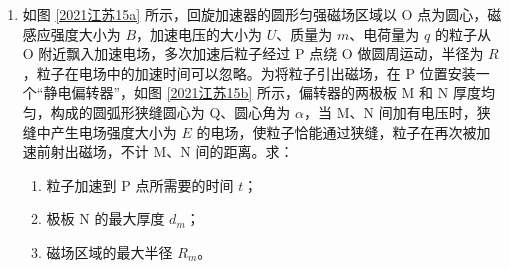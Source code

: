 \documentclass[\gkver]{gaokaozhenti}
\begin{document}
\begin{enumerate}
{B 受力平衡 $F_{1}\cos37^{\circ}+F_{2}\cos37^{\circ}=mg$，$F_{1}\sin37^{\circ}=F_{2}\sin37^{\circ}$。

解得 $F=\frac{3mg}{8}$。

（2）设装置转动的角速度为 $\omega$，对 A 有 $F=M\omega^{2}\cdot\frac{8}{5}L$。

对 B 有 $mg\tan53^{\circ} = m\omega^{2}\cdot\frac{4}{5}L$。

解得 $M = \frac{9}{64}m$。

（3）B 上升的高度 $h = \frac{1}{5}L$，A、B 的动能分别为

$E_{\mathrm{kA}} = \frac{1}{2}M\left(\omega\frac{8}{5}L\right)^{2}$，$E_{\mathrm{kB}} = \frac{1}{2}m\left(\omega\frac{4}{5}L\right)^{2}$。

根据能量守恒定律可知 $W = (E_{\mathrm{kA}} - 0) + (E_{\mathrm{kB}} - 0) + mgh$。

解得 $W = \frac{31}{30}mgL$。
}

\item
如图 \ref{2021江苏15a} 所示，回旋加速器的圆形匀强磁场区域以 O 点为圆心，磁感应强度大小为 $B$，加速电压的大小为 $U$、质量为 $m$、电荷量为 $q$ 的粒子从 O 附近飘入加速电场，多次加速后粒子经过 P 点绕 O 做圆周运动，半径为 $R$，粒子在电场中的加速时间可以忽略。为将粒子引出磁场，在 P 位置安装一个“静电偏转器”，如图 \ref{2021江苏15b} 所示，偏转器的两极板 M 和 N 厚度均匀，构成的圆弧形狭缝圆心为 Q、圆心角为 $\alpha$，当 M、N 间加有电压时，狭缝中产生电场强度大小为 $E$ 的电场，使粒子恰能通过狭缝，粒子在再次被加速前射出磁场，不计 M、N 间的距离。求：
\begin{enumerate}
	\item
	粒子加速到 P 点所需要的时间 $t$；
	\item
	极板 N 的最大厚度 $d_{m}$；
	\item
	磁场区域的最大半径 $R_{m}$。
\end{enumerate}


\end{enumerate}
\end{document}
